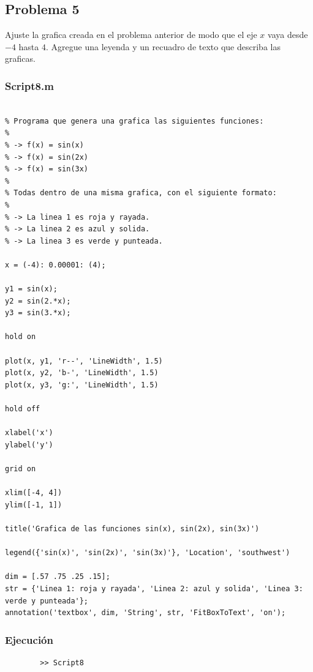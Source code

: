 \documentclass{article}
\begin{document}
	\newpage
	
	\subsection{Problema 5}
	
	Ajuste la grafica creada en el problema anterior de modo que el eje $x$ vaya desde $-4$ hasta $4$. Agregue una leyenda y un recuadro de texto que describa las graficas.
	
	\subsubsection{Script8.m}
	
	\begin{lstlisting}

% Programa que genera una grafica las siguientes funciones:
%
% -> f(x) = sin(x)
% -> f(x) = sin(2x)
% -> f(x) = sin(3x)
% 
% Todas dentro de una misma grafica, con el siguiente formato:
%
% -> La linea 1 es roja y rayada.
% -> La linea 2 es azul y solida.
% -> La linea 3 es verde y punteada.

x = (-4): 0.00001: (4);

y1 = sin(x);
y2 = sin(2.*x);
y3 = sin(3.*x);

hold on

plot(x, y1, 'r--', 'LineWidth', 1.5)
plot(x, y2, 'b-', 'LineWidth', 1.5)
plot(x, y3, 'g:', 'LineWidth', 1.5)

hold off

xlabel('x')
ylabel('y')

grid on

xlim([-4, 4])
ylim([-1, 1])

title('Grafica de las funciones sin(x), sin(2x), sin(3x)')

legend({'sin(x)', 'sin(2x)', 'sin(3x)'}, 'Location', 'southwest')

dim = [.57 .75 .25 .15];
str = {'Linea 1: roja y rayada', 'Linea 2: azul y solida', 'Linea 3: verde y punteada'};
annotation('textbox', dim, 'String', str, 'FitBoxToText', 'on');

	\end{lstlisting}
	
	\subsubsection{Ejecución}
	
	\begin{lstlisting}
		>> Script8
	\end{lstlisting}
	
\end{document}
